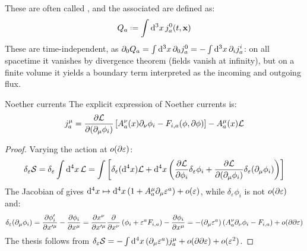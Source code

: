 These are often called , and the associated  are defined as:
\begin{equation}
  Q_a \defeq \int \dd^3 x\, j^0_a(t,\ve{x})
\end{equation}
These are time-independent, as $ \partial_0 Q_a = \int \mathrm{d}^3 x\, \partial_0 j^0_a = - \int \mathrm{d}^3 x\, \partial_i j^i_a $: on all spacetime it vanishes by divergence theorem (fields vanish at infinity), but on a finite volume it yields a boundary term interpreted as the incoming and outgoing flux.

\begin{proposition}{Noether currents}{}
  The explicit expression of Noether currents is:
  \begin{equation}
    j^\mu_a = \frac{\partial \mathcal{L}}{\partial (\partial_\mu \phi_i)} \left[ A^\nu_a(x) \partial_\nu \phi_i - F_{i,a}(\phi, \partial \phi) \right] - A^\mu_a(x) \mathcal{L}
    \label{eq:noether-current}
  \end{equation}
\end{proposition}

\begin{proofbox}
  \begin{proof}
    Varying the action at $ o(\partial \varepsilon) $:
    \begin{equation*}
        \delta_\varepsilon \mathcal{S} = \delta_\varepsilon \int \mathrm{d}^4 x\, \mathcal{L} = \int \left[ \delta_\varepsilon (\mathrm{d}^4 x) \mathcal{L} + \mathrm{d}^4 x \left( \frac{\partial \mathcal{L}}{\partial \phi_i} \delta_\varepsilon \phi_i + \frac{\partial \mathcal{L}}{\partial (\partial_\mu \phi_i)} \delta_\varepsilon (\partial_\mu \phi_i) \right) \right]
    \end{equation*}
    The Jacobian of  gives $ \mathrm{d}^4 x \mapsto \mathrm{d}^4 x \left( 1 + A^\mu_a \partial_\mu \varepsilon^a \right) + o(\varepsilon) $, while $ \delta_\varepsilon \phi_i $ is not $ o(\partial \varepsilon) $ and:
    \begin{equation*}
      \delta_\varepsilon (\partial_\mu \phi_i) = \frac{\partial \phi'_i}{\partial x'^\mu} - \frac{\partial \phi_i}{\partial x^\mu} = \frac{\partial x^\nu}{\partial x'^\mu} \frac{\partial}{\partial x^\nu} \left( \phi_i + \varepsilon^a F_{i,a} \right) - \frac{\partial \phi_i}{\partial x^\mu} = - (\partial_\mu \varepsilon^a) \left( A^\nu_a \partial_\nu \phi_i - F_{i,a} \right) + o(\partial \partial \varepsilon)
    \end{equation*}
    The thesis follows from $ \delta_\varepsilon \mathcal{S} = - \int \mathrm{d}^4 x\, (\partial_\mu \varepsilon^a) j^\mu_a + o(\partial \partial \varepsilon) + o(\varepsilon^2) $.
  \end{proof}
\end{proofbox}


